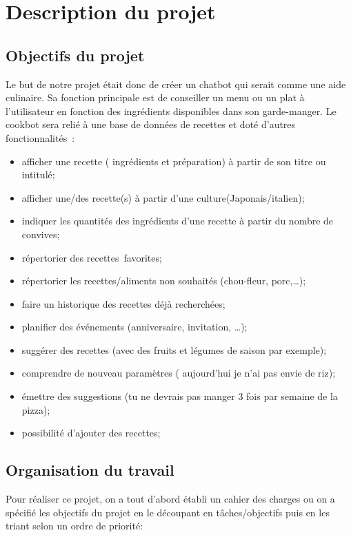 \documentclass{report}
\begin{document}
\section{Description du projet}
\subsection{Objectifs du projet}
Le but de notre projet était donc de créer un chatbot qui serait comme une aide culinaire. Sa fonction principale est de conseiller un menu ou un plat à l'utilisateur en fonction des ingrédients disponibles dans son garde-manger. 
Le cookbot sera relié à une base de données de recettes et doté d'autres fonctionnalités : 
\begin{itemize}
\item afficher une recette ( ingrédients et préparation) à partir de son titre ou intitulé;
\item afficher une/des recette(s) à partir d'une culture(Japonais/italien);
\item indiquer les quantités des ingrédients d'une recette à partir du nombre de convives;
\item répertorier des recettes favorites;
\item répertorier les recettes/aliments non souhaités (chou-fleur, porc,…);
\item faire un historique des recettes déjà recherchées;
\item planifier des événements (anniversaire, invitation, …);
\item suggérer des recettes (avec des fruits et légumes de saison par exemple);
\item comprendre de nouveau paramètres ( aujourd'hui je n'ai pas envie de riz);
\item émettre des suggestions (tu ne devrais pas manger 3 fois par semaine de la pizza);
\item possibilité d'ajouter des recettes;
\end{itemize}
\subsection{Organisation du travail}
Pour réaliser ce projet, on a tout d'abord établi un cahier des charges ou on a spécifié les objectifs du  projet en le découpant en tâches/objectifs puis en les triant selon un ordre de priorité:
\end{document}
